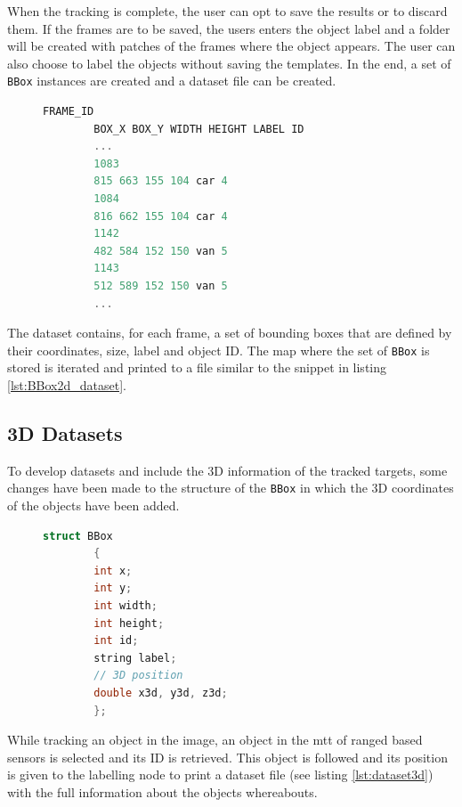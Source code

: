 When the tracking is complete, the user can opt to save the results or to discard them. If the frames are to be saved, the users enters the object label and a folder will be created with patches of the frames where the object appears. The user can also choose to label the objects without saving the templates. In the end, a set of \texttt{BBox} instances are created and a dataset file can be created.

\begin{figure}
	\begin{center}
		\begin{lstlisting}[label={lst:BBox2d_dataset}, caption={2D dataset example snippet},language=c++]
		FRAME_ID 
		BOX_X BOX_Y WIDTH HEIGHT LABEL ID
		...
		1083
		815 663 155 104 car 4
		1084
		816 662 155 104 car 4
		1142
		482 584 152 150 van 5
		1143
		512 589 152 150 van 5
		...\end{lstlisting}
	\end{center}
\end{figure}

The dataset contains, for each frame, a set of bounding boxes that are defined by their coordinates, size, label and object ID. The map where the set of \texttt{BBox} is stored is iterated and printed to a file similar to the snippet in listing \ref{lst:BBox2d_dataset}.


\subsection{3D Datasets}

To develop datasets and include the 3D information of the tracked targets, some changes have been made to the structure of the \texttt{BBox} in which the 3D coordinates of the objects have been added.

\begin{figure}
	\begin{center}
		\begin{lstlisting}[label={lst:bbox3d}, caption={BBox struct definition with 3D capabilities},language=c++]
		struct BBox
		{
		int x;
		int y;
		int width;
		int height;
		int id;
		string label;
		// 3D position
		double x3d, y3d, z3d;
		};		\end{lstlisting}
	\end{center}
\end{figure}

While tracking an object in the image, an object in the \gls{mtt} of ranged based sensors is selected and its ID is retrieved. This object is followed and its position is given to the labelling node to print a dataset file (see listing \ref{lst:dataset3d}) with the full information about the objects whereabouts.


